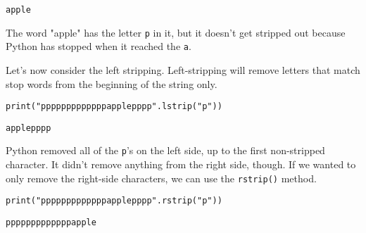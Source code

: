 \begin{lstlisting}[style=none]
apple
\end{lstlisting}
The word "apple" has the letter \verb|p| in it, but it doesn't get stripped out because Python has stopped when it reached the \verb|a|.\par
Let's now consider the left stripping. Left-stripping will remove letters that match stop words from the beginning of the string only.\par
\begin{lstlisting}[style=pippython]
print("pppppppppppppapplepppp".lstrip("p"))
\end{lstlisting}
\begin{lstlisting}[style=none]
applepppp
\end{lstlisting}
Python removed all of the \verb|p|'s on the left side, up to the first non-stripped character. It didn't remove anything from the right side, though. If we wanted to only remove the right-side characters, we can use the \verb|rstrip()| method.\par
\begin{lstlisting}[style=pippython]
print("pppppppppppppapplepppp".rstrip("p"))
\end{lstlisting}
\begin{lstlisting}[style=none]
pppppppppppppapple
\end{lstlisting}
